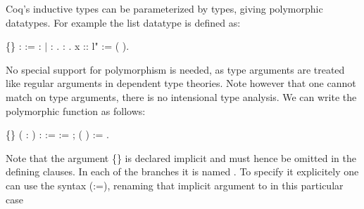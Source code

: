    Coq's inductive types can be parameterized by types, giving polymorphic datatypes.
   For example the list datatype is defined as:
   \begin{coqdoccode}
\coqdocemptyline
\coqdocnoindent
{}  \{\} :  :=  :  \ensuremath{|}  :     .\coqdoceol
\coqdocemptyline
\coqdocnoindent
{}  :  .\coqdoceol
\coqdocnoindent
{} x :: l" := (  ).\coqdoceol
\coqdocemptyline
\end{coqdoccode}
No special support for polymorphism is needed, as type arguments are treated 
   like regular arguments in dependent type theories. Note however that one cannot
   match on type arguments, there is no intensional type analysis.
   We can write the polymorphic  function as follows:
\begin{coqdoccode}
\coqdocemptyline
\coqdocnoindent
{}  \{\} ( :  ) :   :=\coqdoceol
\coqdocnoindent
{}  :=  ;\coqdoceol
\coqdocnoindent
{} (  ) := .\coqdoceol
\coqdocemptyline
\end{coqdoccode}
Note that the argument \{\} is declared implicit and must hence be
 omitted in the defining clauses. In each of the branches it is named
 . To specify it explicitely one can use the syntax (:=),
 renaming that implicit argument to  in this particular case 

